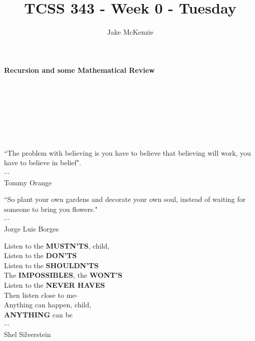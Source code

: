 \documentclass[12pt]{article}
\begin{document}
\title{TCSS 343 - Week 0 - Tuesday}
\author{Jake McKenzie}
\maketitle
\noindent\centerline{\textbf{Recursion and some Mathematical Review}}\\\\\\\\\\\\
\begin{center}
    ``The problem with believing is you have to believe that believing will work, you have to believe in belief". \\$\cdots$\\ Tommy Orange
\end{center}
\begin{center}
    ``So plant your own gardens and decorate your own soul, instead of waiting for someone to bring you flowers." \\$\cdots$\\ Jorge Luis Borges
\end{center}
\begin{center}
Listen to the \textbf{MUSTN'TS}, child,\\
Listen to the \textbf{DON'TS}\\
Listen to the \textbf{SHOULDN'TS}\\
The \textbf{IMPOSSIBLES}, the \textbf{WONT'S}\\
Listen to the \textbf{NEVER HAVES}\\
Then listen close to me-\\
Anything can happen, child,\\
\textbf{ANYTHING} can be\\ 
$\cdots$\\
Shel Silverstein 
\end{center}
\newpage
\end{document}
